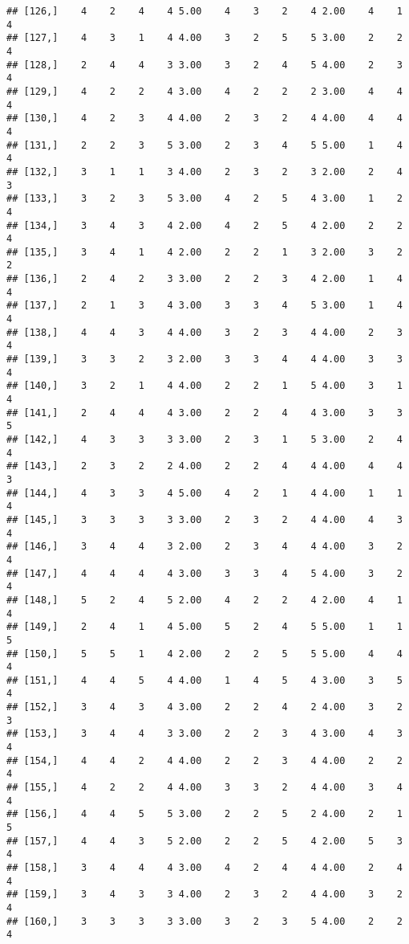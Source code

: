 \documentclass[]{article}
\begin{document}
\begin{verbatim}
## [126,]    4    2    4    4 5.00    4    3    2    4 2.00    4    1    4
## [127,]    4    3    1    4 4.00    3    2    5    5 3.00    2    2    4
## [128,]    2    4    4    3 3.00    3    2    4    5 4.00    2    3    4
## [129,]    4    2    2    4 3.00    4    2    2    2 3.00    4    4    4
## [130,]    4    2    3    4 4.00    2    3    2    4 4.00    4    4    4
## [131,]    2    2    3    5 3.00    2    3    4    5 5.00    1    4    4
## [132,]    3    1    1    3 4.00    2    3    2    3 2.00    2    4    3
## [133,]    3    2    3    5 3.00    4    2    5    4 3.00    1    2    4
## [134,]    3    4    3    4 2.00    4    2    5    4 2.00    2    2    4
## [135,]    3    4    1    4 2.00    2    2    1    3 2.00    3    2    2
## [136,]    2    4    2    3 3.00    2    2    3    4 2.00    1    4    4
## [137,]    2    1    3    4 3.00    3    3    4    5 3.00    1    4    4
## [138,]    4    4    3    4 4.00    3    2    3    4 4.00    2    3    4
## [139,]    3    3    2    3 2.00    3    3    4    4 4.00    3    3    4
## [140,]    3    2    1    4 4.00    2    2    1    5 4.00    3    1    4
## [141,]    2    4    4    4 3.00    2    2    4    4 3.00    3    3    5
## [142,]    4    3    3    3 3.00    2    3    1    5 3.00    2    4    4
## [143,]    2    3    2    2 4.00    2    2    4    4 4.00    4    4    3
## [144,]    4    3    3    4 5.00    4    2    1    4 4.00    1    1    4
## [145,]    3    3    3    3 3.00    2    3    2    4 4.00    4    3    4
## [146,]    3    4    4    3 2.00    2    3    4    4 4.00    3    2    4
## [147,]    4    4    4    4 3.00    3    3    4    5 4.00    3    2    4
## [148,]    5    2    4    5 2.00    4    2    2    4 2.00    4    1    4
## [149,]    2    4    1    4 5.00    5    2    4    5 5.00    1    1    5
## [150,]    5    5    1    4 2.00    2    2    5    5 5.00    4    4    4
## [151,]    4    4    5    4 4.00    1    4    5    4 3.00    3    5    4
## [152,]    3    4    3    4 3.00    2    2    4    2 4.00    3    2    3
## [153,]    3    4    4    3 3.00    2    2    3    4 3.00    4    3    4
## [154,]    4    4    2    4 4.00    2    2    3    4 4.00    2    2    4
## [155,]    4    2    2    4 4.00    3    3    2    4 4.00    3    4    4
## [156,]    4    4    5    5 3.00    2    2    5    2 4.00    2    1    5
## [157,]    4    4    3    5 2.00    2    2    5    4 2.00    5    3    4
## [158,]    3    4    4    4 3.00    4    2    4    4 4.00    2    4    4
## [159,]    3    4    3    3 4.00    2    3    2    4 4.00    3    2    4
## [160,]    3    3    3    3 3.00    3    2    3    5 4.00    2    2    4

\end{verbatim}
\end{document}
